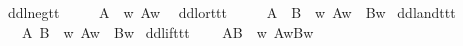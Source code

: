 \begin{isabellebody}
\begin{isamarkuptext}
\end{isamarkuptext}\isamarkuptrue%
%
\isanewline
{}\isamarkupfalse%
\ ddlneg{\isacharcolon}{\isacharcolon}{\isachardoublequoteopen}t{\isasymRightarrow}t{\isachardoublequoteclose}\ {\isacharparenleft}{\isachardoublequoteopen}\isactrlbold {\isasymnot}{\isachardoublequoteclose}{\isacharparenright}\ \isanewline
\ \ \ {\isachardoublequoteopen}\isactrlbold {\isasymnot}A\ {\isasymequiv}\ {\isasymlambda}w{\isachardot}\ {\isasymnot}A{\isacharparenleft}w{\isacharparenright}{\isachardoublequoteclose}\ \isanewline
{}\isamarkupfalse%
\ ddlor{\isacharcolon}{\isacharcolon}{\isachardoublequoteopen}t{\isasymRightarrow}t{\isasymRightarrow}t{\isachardoublequoteclose}\ {\isacharparenleft}{\isachardoublequoteopen}{\isacharunderscore}\isactrlbold {\isasymor}{\isacharunderscore}{\isachardoublequoteclose}{\isacharparenright}\ \isanewline
\ \ \ {\isachardoublequoteopen}A\ \isactrlbold {\isasymor}\ B\ {\isasymequiv}\ {\isasymlambda}w{\isachardot}\ {\isacharparenleft}A{\isacharparenleft}w{\isacharparenright}\ {\isasymor}\ B{\isacharparenleft}w{\isacharparenright}{\isacharparenright}{\isachardoublequoteclose}\isanewline
{}\isamarkupfalse%
\ ddland{\isacharcolon}{\isacharcolon}{\isachardoublequoteopen}t{\isasymRightarrow}t{\isasymRightarrow}t{\isachardoublequoteclose}\ {\isacharparenleft}{\isachardoublequoteopen}{\isacharunderscore}\isactrlbold {\isasymand}{\isacharunderscore}{\isachardoublequoteclose}{\isacharparenright}\isanewline
\ \ \ {\isachardoublequoteopen}A\isactrlbold {\isasymand}\ B\ {\isasymequiv}\ {\isasymlambda}w{\isachardot}\ {\isacharparenleft}A{\isacharparenleft}w{\isacharparenright}\ {\isasymand}\ B{\isacharparenleft}w{\isacharparenright}{\isacharparenright}{\isachardoublequoteclose}\isanewline
{}\isamarkupfalse%
\ ddlif{\isacharcolon}{\isacharcolon}{\isachardoublequoteopen}t{\isasymRightarrow}t{\isasymRightarrow}t{\isachardoublequoteclose}\ {\isacharparenleft}{\isachardoublequoteopen}{\isacharunderscore}\isactrlbold {\isasymrightarrow}{\isacharunderscore}{\isachardoublequoteclose}{\isacharparenright}\isanewline
\ \ \ {\isachardoublequoteopen}A\isactrlbold {\isasymrightarrow}B\ {\isasymequiv}\ {\isacharparenleft}{\isasymlambda}w{\isachardot}\ A{\isacharparenleft}w{\isacharparenright}{\isasymlongrightarrow}B{\isacharparenleft}w{\isacharparenright}{\isacharparenright}{\isachardoublequoteclose}\isanewline
{}\isamarkupfalse%

\end{isabellebody}
